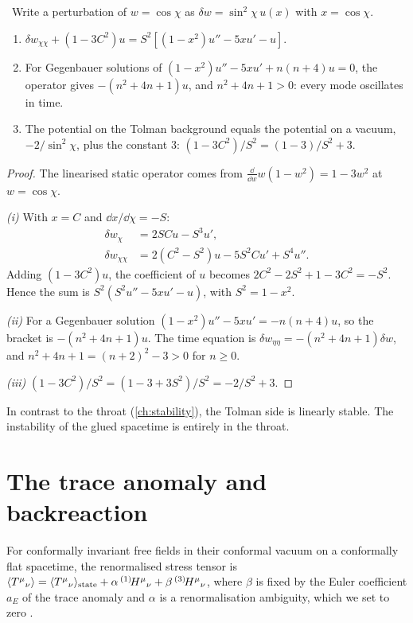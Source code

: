 \begin{theorem}\label{thm:tolmanspectrum}\ver\
Write a perturbation of $w=\cos\chi$ as $\delta w=\sin^2\chi\,u(x)$ with $x=\cos\chi$.
\begin{enumerate}[label=(\roman*)]
\item $\delta w_{\chi\chi}+(1-3C^2)u=S^2[(1-x^2)u''-5xu'-u]$.
\item For Gegenbauer solutions of $(1-x^2)u''-5xu'+n(n+4)u=0$, the operator gives $-(n^2+4n+1)u$, and $n^2+4n+1>0$: every mode oscillates in time.
\item The potential on the Tolman background equals the potential on a vacuum, $-2/\sin^2\chi$, plus the constant $3$: $(1-3C^2)/S^2=(1-3)/S^2+3$.
\end{enumerate}
\end{theorem}
\begin{proof}
The linearised static operator comes from $\frac{\dd}{\dd w}w(1-w^2)=1-3w^2$ at $w=\cos\chi$.

\emph{(i)} With $x=C$ and $\dd x/\dd\chi=-S$:
\begin{align*}
\delta w_\chi&=2SCu-S^3u',\\
\delta w_{\chi\chi}&=2(C^2-S^2)u-5S^2Cu'+S^4u'' .
\end{align*}
Adding $(1-3C^2)u$, the coefficient of $u$ becomes $2C^2-2S^2+1-3C^2=-S^2$. Hence the sum is $S^2(S^2u''-5xu'-u)$, with $S^2=1-x^2$.

\emph{(ii)} For a Gegenbauer solution $(1-x^2)u''-5xu'=-n(n+4)u$, so the bracket is $-(n^2+4n+1)u$. The time equation is $\delta w_{\eta\eta}=-(n^2+4n+1)\delta w$, and $n^2+4n+1=(n+2)^2-3>0$ for $n\ge0$.

\emph{(iii)} $(1-3C^2)/S^2=(1-3+3S^2)/S^2=-2/S^2+3$.
\end{proof}


In contrast to the throat (\cref{ch:stability}), the Tolman side is linearly stable. The instability of the glued spacetime is entirely in the throat.

\section{The trace anomaly and backreaction}

For conformally invariant free fields in their conformal vacuum on a conformally flat spacetime, the renormalised stress tensor is $\langle T^\mu{}_\nu\rangle=\langle T^\mu{}_\nu\rangle_{\rm state}+\alpha\,{}^{(1)}\!H^\mu{}_\nu+\beta\,{}^{(3)}\!H^\mu{}_\nu$, where $\beta$ is fixed by the Euler coefficient $a_E$ of the trace anomaly and $\alpha$ is a renormalisation ambiguity, which we set to zero \cite{BirrellDavies,BrownCassidy1977} \ext.

